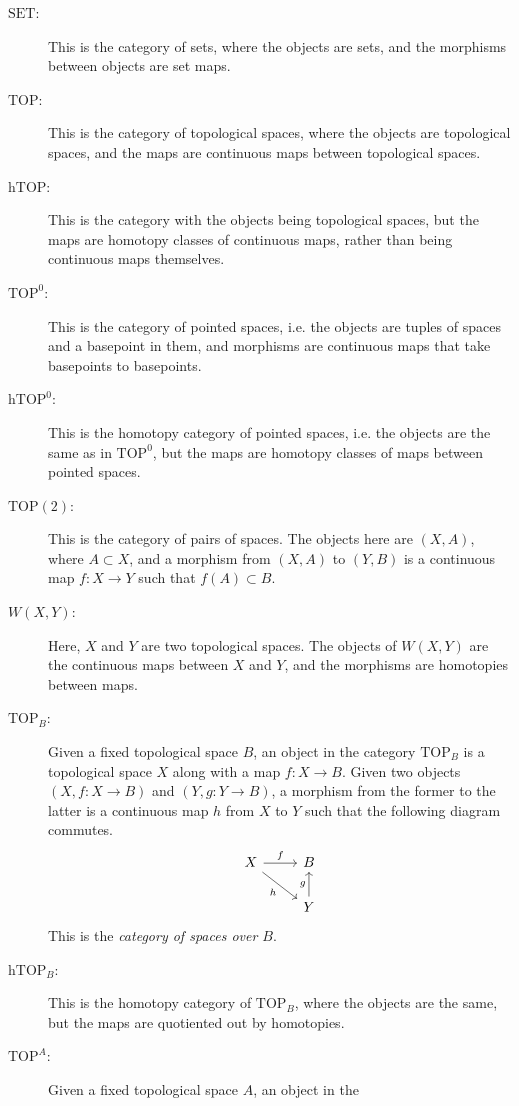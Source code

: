 \documentclass[12pt, notitlepage]{article}
\theoremstyle{definition}
\newcommand{\cat}[1]{\mathrm{#1}}
\begin{document}
\begin{description}
\item[$\cat{SET}$:] This is the category of sets, where the objects
  are sets, and the morphisms between objects are set maps.
\item[$\cat{TOP}$:] This is the category of topological spaces, where
  the objects are topological spaces, and the maps are continuous maps
  between topological spaces.
\item[$\cat{hTOP}$:] This is the category with the objects being
  topological spaces, but the maps are homotopy classes of continuous
  maps, rather than being continuous maps themselves.
\item[$\cat{TOP^0}$:] This is the category of pointed spaces, i.e. the
  objects are tuples of spaces and a basepoint in them, and morphisms
  are continuous maps that take basepoints to basepoints.
\item[$\cat{hTOP^0}$:] This is the homotopy category of pointed
  spaces, i.e.  the objects are the same as in $\cat{TOP^0}$, but the
  maps are homotopy classes of maps between pointed spaces.
\item[$\cat{TOP(2)}$:] This is the category of pairs of spaces. The
  objects here are $(X,A)$, where $A \subset X$, and a morphism from
  $(X, A)$ to $(Y, B)$ is a continuous map $f: X \to Y$ such that
  $f(A) \subset B$.
\item[$W(X,Y)$:] Here, $X$ and $Y$ are two topological spaces. The
  objects of $W(X,Y)$ are the continuous maps between $X$ and $Y$, and
  the morphisms are homotopies between maps.
\item[$\cat{TOP}_B$:] Given a fixed topological space $B$, an object
  in the category $\cat{TOP}_B$ is a topological space $X$ along with
  a map $f: X \to B$.  Given two objects $(X, f : X \to B)$ and
  $(Y, g : Y \to B)$, a morphism from the former to the latter is a
  continuous map $h$ from $X$ to $Y$ such that the following diagram
  commutes.
    \[
    \begin{tikzcd}
    X \arrow{r}{f} \arrow[swap]{dr}{h} & B  \\
    & Y \arrow{u}{g}
    \end{tikzcd}
    \]
    This is the \emph{category of spaces over $B$}.
  \item[$\cat{hTOP}_B$:] This is the homotopy category of $\cat{TOP}_B$, where the
    objects are the same, but the maps are quotiented out by homotopies.
  \item[$\cat{TOP}^A$:] Given a fixed topological space $A$, an object in the

\end{description}
\end{document}
